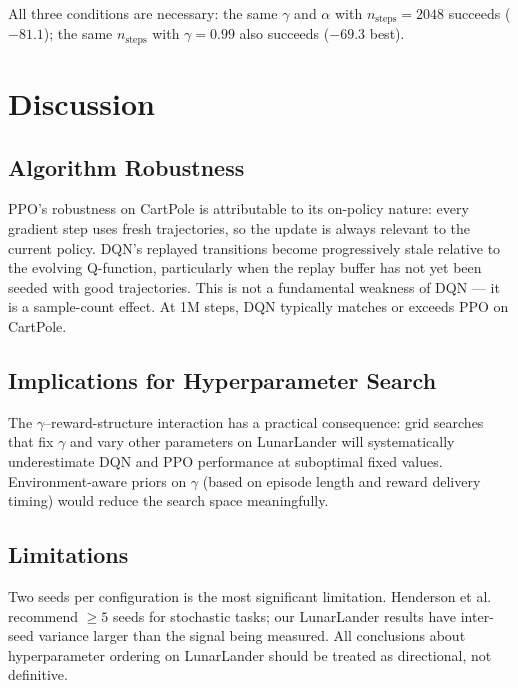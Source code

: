 \documentclass[10pt, a4paper, twocolumn]{article}
\begin{document}
All three conditions are necessary: the same $\gamma$ and $\alpha$ with
$n_\mathrm{steps}=2048$ succeeds ($-81.1$); the same $n_\mathrm{steps}$
with $\gamma=0.99$ also succeeds ($-69.3$ best).

\section{Discussion}

\subsection{Algorithm Robustness}

PPO's robustness on CartPole is attributable to its on-policy nature: every
gradient step uses fresh trajectories, so the update is always relevant to the
current policy.
DQN's replayed transitions become progressively stale relative to the evolving
Q-function, particularly when the replay buffer has not yet been seeded with
good trajectories.
This is not a fundamental weakness of DQN — it is a sample-count effect.
At 1M steps, DQN typically matches or exceeds PPO on CartPole.

\subsection{Implications for Hyperparameter Search}

The $\gamma$--reward-structure interaction has a practical consequence:
grid searches that fix $\gamma$ and vary other parameters on LunarLander will
systematically underestimate DQN and PPO performance at suboptimal fixed values.
Environment-aware priors on $\gamma$ (based on episode length and reward
delivery timing) would reduce the search space meaningfully.

\subsection{Limitations}

Two seeds per configuration is the most significant limitation.
Henderson et al.~\cite{henderson2018deep} recommend $\geq 5$ seeds for
stochastic tasks; our LunarLander results have inter-seed variance larger
than the signal being measured.
All conclusions about hyperparameter ordering on LunarLander should be treated
as directional, not definitive.

\end{document}
